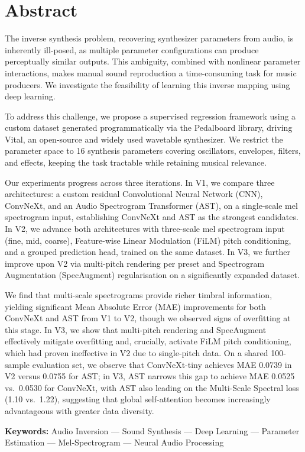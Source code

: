 \section*{Abstract}

\noindent
The inverse synthesis problem, recovering synthesizer parameters from audio, is inherently ill-posed, as multiple parameter configurations can produce perceptually similar outputs. This ambiguity, combined with nonlinear parameter interactions, makes manual sound reproduction a time-consuming task for music producers. We investigate the feasibility of learning this inverse mapping using deep learning.

\noindent \newline
To address this challenge, we propose a supervised regression framework using a custom dataset generated programmatically via the Pedalboard library, driving Vital, an open-source and widely used wavetable synthesizer. We restrict the parameter space to 16 synthesis parameters covering oscillators, envelopes, filters, and effects, keeping the task tractable while retaining musical relevance.

\noindent \newline
Our experiments progress across three iterations. In V1, we compare three architectures: a custom residual Convolutional Neural Network (CNN), ConvNeXt, and an Audio Spectrogram Transformer (AST), on a single-scale mel spectrogram input, establishing ConvNeXt and AST as the strongest candidates. In V2, we advance both architectures with three-scale mel spectrogram input (fine, mid, coarse), Feature-wise Linear Modulation (FiLM) pitch conditioning, and a grouped prediction head, trained on the same dataset. In V3, we further improve upon V2 via multi-pitch rendering per preset and Spectrogram Augmentation (SpecAugment) regularisation on a significantly expanded dataset.

\noindent \newline
We find that multi-scale spectrograms provide richer timbral information, yielding significant Mean Absolute Error (MAE) improvements for both ConvNeXt and AST from V1 to V2, though we observed signs of overfitting at this stage. In V3, we show that multi-pitch rendering and SpecAugment effectively mitigate overfitting and, crucially, activate FiLM pitch conditioning, which had proven ineffective in V2 due to single-pitch data. On a shared 100-sample evaluation set, we observe that ConvNeXt-tiny achieves MAE 0.0739 in V2 versus 0.0755 for AST; in V3, AST narrows this gap to achieve MAE 0.0525 vs.\ 0.0530 for ConvNeXt, with AST also leading on the Multi-Scale Spectral loss (1.10 vs.\ 1.22), suggesting that global self-attention becomes increasingly advantageous with greater data diversity.

\noindent \newline
\textbf{Keywords:} Audio Inversion --- Sound Synthesis --- Deep Learning --- Parameter Estimation --- Mel-Spectrogram --- Neural Audio Processing

